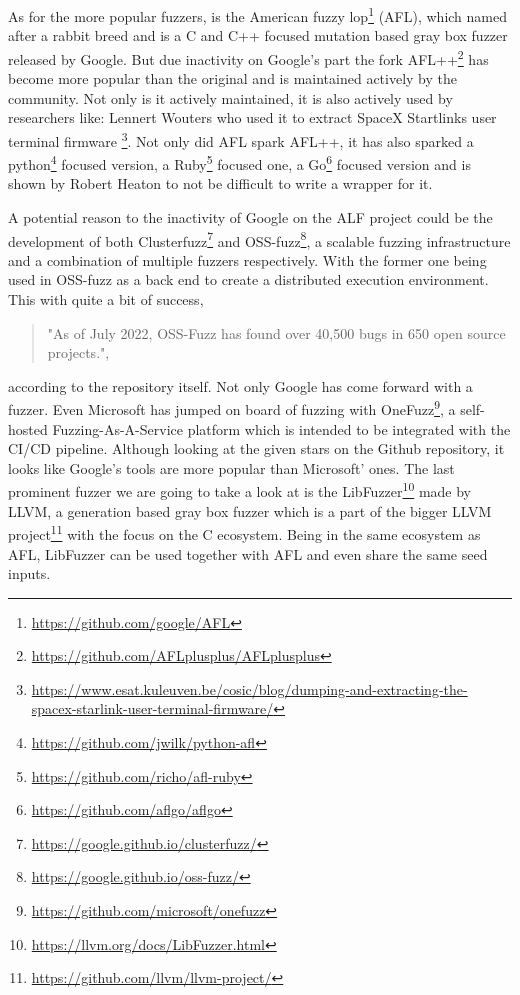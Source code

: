 As for the more popular fuzzers, is the American fuzzy lop\footnote{\url{https://github.com/google/AFL}} (AFL), which named after a rabbit breed and is a C and C++ focused mutation based gray box fuzzer released by Google. But due inactivity on Google's part the fork AFL++\footnote{\url{https://github.com/AFLplusplus/AFLplusplus}} has become more popular than the original and is maintained actively by the community\cite{27AFL++}. Not only is it actively maintained, it is also actively used by researchers like: Lennert Wouters who used it to extract SpaceX Startlinks user terminal firmware \footnote{\url{https://www.esat.kuleuven.be/cosic/blog/dumping-and-extracting-the-spacex-starlink-user-terminal-firmware/}}. 
Not only did AFL spark AFL++, it has also sparked a python\footnote{\url{https://github.com/jwilk/python-afl}} focused version, a Ruby\footnote{\url{https://github.com/richo/afl-ruby}} focused one, a Go\footnote{\url{https://github.com/aflgo/aflgo}} focused version and is shown by Robert Heaton\cite{AFLWrapper} to not be difficult to write a wrapper for it. 

A potential reason to the inactivity of Google on the ALF project could be the development of both Clusterfuzz\footnote{\url{https://google.github.io/clusterfuzz/}} and OSS-fuzz\footnote{\url{https://google.github.io/oss-fuzz/}}, a scalable fuzzing infrastructure and a combination of multiple fuzzers respectively. With the former one being used in OSS-fuzz as a back end to create a distributed execution environment. This with quite a bit of success\cite{31OSS-FuzzBugs},
\begin{quote} 
	"As of July 2022, OSS-Fuzz has found over 40,500 bugs in 650 open source projects.",
\end{quote} according to the repository itself. 
Not only Google has come forward with a fuzzer. Even Microsoft has jumped on board of fuzzing with OneFuzz\footnote{\url{https://github.com/microsoft/onefuzz}}, a self-hosted Fuzzing-As-A-Service platform which is intended to be integrated with the CI/CD pipeline. Although looking at the given stars on the Github repository, it looks like Google's tools are more popular than Microsoft' ones.
The last prominent fuzzer we are going to take a look at is the LibFuzzer\footnote{\url{https://llvm.org/docs/LibFuzzer.html}} made by LLVM, a generation based gray box fuzzer which is a part of the bigger LLVM project\footnote{\url{https://github.com/llvm/llvm-project/}} with the focus on the C ecosystem. Being in the same ecosystem as AFL, LibFuzzer can be used together with AFL and even share the same seed inputs.

